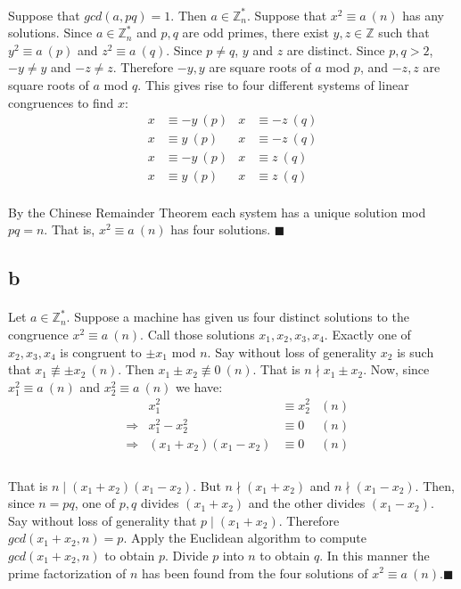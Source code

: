 \documentclass[letterpaper,12pt,oneside,onecolumn]{report}
\begin{document}
\paragraph{}
Suppose that $gcd(a,pq) = 1$. Then $a \in \mathbb{Z}^*_n$. Suppose that $x^2 \equiv a\ (n)$ has any solutions. Since $a \in \mathbb{Z}^*_n$ and $p,q$ are odd primes, there exist $y, z \in \mathbb{Z}$ such that $y^2 \equiv a\ (p)$ and $z^2 \equiv a\ (q)$. Since $p \neq q$, $y$ and $z$ are distinct. Since $p,q > 2$, $-y \neq y$ and $-z \neq z$. Therefore $-y,y$ are square roots of $a$ mod $p$, and $-z, z$ are square roots of $a$ mod $q$. This gives rise to four different systems of linear congruences to find $x$:
\begin{align}
x &\equiv -y\ (p) &x &\equiv -z\ (q)\\
x &\equiv y\ (p) &x &\equiv -z\ (q)\\
x &\equiv -y\ (p) &x &\equiv z\ (q)\\
x &\equiv y\ (p) &x &\equiv z\ (q)
\end{align}
\paragraph{}
By the Chinese Remainder Theorem each system has a unique solution mod $pq = n$. That is, $x^2 \equiv a\ (n)$ has four solutions. $\blacksquare$
\subsection*{b}
\paragraph{}
Let $a \in \mathbb{Z}_n^*$. Suppose a machine has given us four distinct solutions to the congruence $x^2 \equiv a\ (n)$. Call those solutions $x_1,x_2,x_3,x_4$. Exactly one of $x_2, x_3, x_4$ is congruent to $\pm x_1$ mod $n$. Say without loss of generality $x_2$ is such that $x_1 \not\equiv \pm x_2\ (n)$. Then $x_1 \pm x_2 \not\equiv 0\ (n)$. That is $n \nmid x_1 \pm x_2$. Now, since $x_1^2 \equiv a\ (n)$ and $x_2^2 \equiv a\ (n)$ we have:
\begin{align*}
&\ &x_1^2 &\equiv x_2^2 &(n)\\
&\Rightarrow &x_1^2 - x_2^2 &\equiv 0 &(n) \\
&\Rightarrow &(x_1 + x_2)(x_1 - x_2) &\equiv 0 &(n) \\
\end{align*}
\paragraph{}
That is $n \mid (x_1 + x_2)(x_1 - x_2)$. But $n \nmid (x_1 + x_2)$ and $n \nmid (x_1 - x_2)$. Then, since $n = pq$, one of $p,q$ divides $(x_1 + x_2)$ and the other divides $(x_1 - x_2)$. Say without loss of generality that $p \mid (x_1 + x_2)$. Therefore $gcd(x_1 + x_2, n) = p$. Apply the Euclidean algorithm to compute $gcd(x_1 + x_2,n)$ to obtain $p$. Divide $p$ into $n$ to obtain $q$. In this manner the prime factorization of $n$ has been found from the four solutions of $x^2 \equiv a\ (n)$.$\blacksquare$
\end{document}
